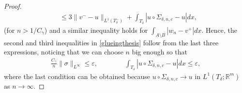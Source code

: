\documentclass[10pt,a4paper]{amsart}
\newcommand{\R}{\mathbb{R}}
\begin{document}
\begin{proof}
\begin{align*}
&\leq 3 \|v^--u\|_{L^1(T_\delta^-)}+\int_{T_\delta}|u\circ\Sigma_{\delta,n,c}-u|dx,
\end{align*}
(for $n>1/C_\gamma$)
and a similar inequality holds for $\int_{A\setminus B}|w_n-v^+|dx$.
Hence, the second and third inequalities in \eqref{glueingthesis} follow from the last three expressions, noticing that we can choose $n$ big enough so that 
\begin{align*}
\frac {C_\gamma}{n}\|\sigma\|_{L^\infty}\leq \varepsilon,\qquad \qquad \int_{T_\delta}|u\circ\Sigma_{\delta,n,c}-u|dx\leq \varepsilon,
\end{align*}
where the last condition can be obtained because  $u\circ\Sigma_{\delta,n,c}\rightarrow u$ in $L^1(T_\delta;\R^m)$ as $n\rightarrow \infty$.
\end{proof}
\end{document}
